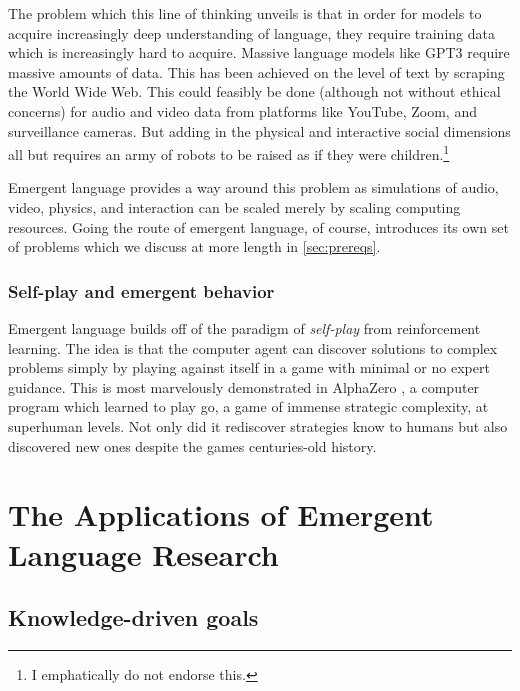 The problem which this line of thinking unveils is that in order for models to acquire increasingly deep understanding of language, they require training data which is increasingly hard to acquire.
Massive language models like GPT3  require massive amounts of data.
This has been achieved  on the level of text by scraping the World Wide Web.
This could feasibly be done (although not without ethical concerns) for audio and video data from platforms like YouTube, Zoom, and surveillance cameras.
But adding in the physical and interactive social dimensions all but requires an army of robots to be raised as if they were children.\footnote{I emphatically do not endorse this.}

Emergent language provides a way around this problem as simulations of audio, video, physics, and interaction can be scaled merely by scaling computing resources.
Going the route of emergent language, of course, introduces its own set of problems which we discuss at more length in \cref{sec:prereqs}.


\subsection{Self-play and emergent behavior}
Emergent language builds off of the paradigm of \emph{self-play} from reinforcement learning.
The idea is that the computer agent can discover solutions to complex problems simply by playing against itself in a game with minimal or no expert guidance.
This is most marvelously demonstrated in AlphaZero , a computer program which learned to play go, a game of immense strategic complexity, at superhuman levels.
Not only did it rediscover strategies know to humans but also discovered new ones despite the games centuries-old history.


\chapter{The Applications of Emergent Language Research}\label{sec:goals}
 
\section{Knowledge-driven goals}
